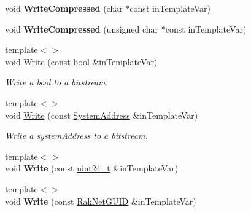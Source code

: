 \begin{DoxyCompactItemize}
\item 
\hypertarget{class_rak_net_1_1_bit_stream_af746ca7c1a0878ed7c11abc2014243e8}{void {\bfseries Write\-Compressed} (char $\ast$const in\-Template\-Var)}\label{class_rak_net_1_1_bit_stream_af746ca7c1a0878ed7c11abc2014243e8}

\item 
\hypertarget{class_rak_net_1_1_bit_stream_a0b48097dd22335d696c8a7f87a03a0f5}{void {\bfseries Write\-Compressed} (unsigned char $\ast$const in\-Template\-Var)}\label{class_rak_net_1_1_bit_stream_a0b48097dd22335d696c8a7f87a03a0f5}

\item 
{\footnotesize template$<$$>$ }\\void \hyperlink{class_rak_net_1_1_bit_stream_a66b52fab9bbf560e6e1f489fcb721606}{Write} (const bool \&in\-Template\-Var)
\begin{DoxyCompactList}\small\item\em Write a bool to a bitstream. \end{DoxyCompactList}\item 
{\footnotesize template$<$$>$ }\\void \hyperlink{class_rak_net_1_1_bit_stream_aa0e36831cf50b73139527f724520af97}{Write} (const \hyperlink{struct_rak_net_1_1_system_address}{System\-Address} \&in\-Template\-Var)
\begin{DoxyCompactList}\small\item\em Write a system\-Address to a bitstream. \end{DoxyCompactList}\item 
\hypertarget{class_rak_net_1_1_bit_stream_aac3978c8f17856aeba3f233f86c0cf97}{{\footnotesize template$<$$>$ }\\void {\bfseries Write} (const \hyperlink{struct_rak_net_1_1uint24__t}{uint24\-\_\-t} \&in\-Template\-Var)}\label{class_rak_net_1_1_bit_stream_aac3978c8f17856aeba3f233f86c0cf97}

\item 
\hypertarget{class_rak_net_1_1_bit_stream_a46af3ebf6ec3ff6e046babe89f748ef2}{{\footnotesize template$<$$>$ }\\void {\bfseries Write} (const \hyperlink{struct_rak_net_1_1_rak_net_g_u_i_d}{Rak\-Net\-G\-U\-I\-D} \&in\-Template\-Var)}\label{class_rak_net_1_1_bit_stream_a46af3ebf6ec3ff6e046babe89f748ef2}


\end{DoxyCompactItemize}
